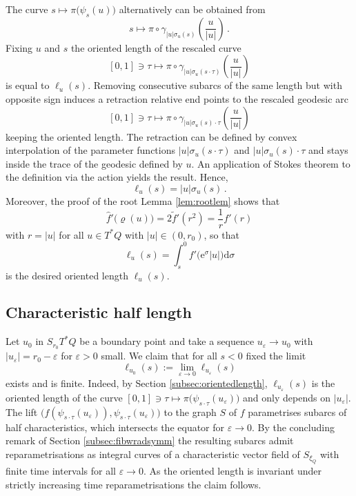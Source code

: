 \documentclass{amsart}
\theoremstyle{definition}
\newcommand{\rmd}{\mathrm d}
\newcommand{\rme}{\mathrm e}
\newcommand{\ra}{\rightarrow}
\begin{document}
The curve $s\mapsto\pi\big(\psi_s(u)\big)$
alternatively can be obtained from
\[
s\longmapsto
\pi\circ\gamma_{|u|\sigma_u(s)}
\left(\frac{u}{|u|}\right)
\,.
\]
Fixing $u$ and $s$ the oriented length of
the rescaled curve
\[
[0,1]\ni\tau\longmapsto
\pi\circ\gamma_{|u|\sigma_u(s\cdot\tau)}
\left(\frac{u}{|u|}\right)
\]
is equal to $\ell_u(s)$.
Removing consecutive subarcs of the same length
but with opposite sign 
induces a retraction relative end points
to the rescaled geodesic arc
\[
[0,1]\ni\tau\longmapsto
\pi\circ\gamma_{|u|\sigma_u(s)\cdot\tau}
\left(\frac{u}{|u|}\right)
\]
keeping the oriented length.
The retraction can be defined
by convex interpolation of the parameter functions
$|u|\sigma_u(s\cdot\tau)$ and $|u|\sigma_u(s)\cdot\tau$
and stays inside the trace of the geodesic defined by $u$.
An application of Stokes theorem
to the definition via the action yields the result.
Hence,
\[
\ell_u(s)=|u|\sigma_u(s)
\,.
\]
Moreover,
the proof of the root Lemma \ref{lem:rootlem} shows that
\[
\hat{f}'\big(\varrho(u)\big)=
2\tilde{f}'(r^2)=
\frac{1}{r}f'(r)
\]
with $r=|u|$ for all $u\in T^*Q$ with $|u|\in(0,r_0)$,
so that
\[
\ell_u(s)=
\int_s^0
  f'\big(\rme^{\sigma}|u|\big)
\rmd\sigma
\]
is the desired oriented length $\ell_u(s)$.



\subsection{Characteristic half
length\label{subsec:charhalflength}}

Let $u_0$ in $S_{r_0}T^*Q$ be a boundary point 
and take a sequence $u_{\varepsilon}\ra u_0$
with $|u_{\varepsilon}|=r_0-\varepsilon$
for $\varepsilon>0$ small.
We claim that for all $s<0$ fixed the limit
\[
 \ell_{u_0}(s):=\lim_{\varepsilon\ra0}\ell_{u_{\varepsilon}}(s)
\]
exists and is finite.
Indeed,
by Section \ref{subsec:orientedlength},
$\ell_{u_{\varepsilon}}(s)$ is the oriented length
of the curve
$[0,1]\ni\tau\mapsto\pi\big(\psi_{s\cdot\tau}(u_{\varepsilon})\big)$
and only depends on $|u_{\varepsilon}|$.
The lift
$\big(f(\psi_{s\cdot\tau}(u_{\varepsilon})),\psi_{s\cdot\tau}(u_{\varepsilon})\big)$
to the graph $S$ of $f$
parametrises subarcs of half characteristics,
which intersects the equator for $\varepsilon\ra0$.
By the concluding remark of Section \ref{subsec:fibwradsymm}
the resulting subarcs admit reparametrisations
as integral curves of a characteristic vector field of $S_{\xi_Q}$
with finite time intervals for all $\varepsilon\ra0$.
As the oriented length is invariant under strictly increasing
time reparametrisations the claim follows.
\end{document}
